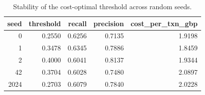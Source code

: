 \begin{table}
\caption{Stability of the cost-optimal threshold across random seeds.}
\label{tab:table7_seed_stability}
\begin{tabular}{rrrrr}
\toprule
seed & threshold & recall & precision & cost\_per\_txn\_gbp \\
\midrule
0 & 0.2550 & 0.6256 & 0.7135 & 1.9198 \\
1 & 0.3478 & 0.6345 & 0.7886 & 1.8459 \\
2 & 0.4000 & 0.6041 & 0.8137 & 1.9344 \\
42 & 0.3704 & 0.6028 & 0.7480 & 2.0897 \\
2024 & 0.2703 & 0.6079 & 0.7840 & 2.0228 \\
\bottomrule
\end{tabular}
\end{table}
